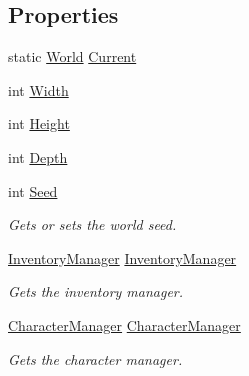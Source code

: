 \subsection*{Properties}
\begin{DoxyCompactItemize}
\item 
static \hyperlink{class_world}{World} \hyperlink{class_world_a611a474efcbf8859dc219c66e667abb4}{Current}
\item 
int \hyperlink{class_world_a861a1e47079f04cf1de46887f76f6177}{Width}
\item 
int \hyperlink{class_world_ac3b5695035eeab526a054329773366fc}{Height}
\item 
int \hyperlink{class_world_a67394494a39fdb85e259e9db96836b8b}{Depth}
\item 
int \hyperlink{class_world_a41b0e31e73a738aece63fcd312be09fa}{Seed}
\begin{DoxyCompactList}\small\item\em Gets or sets the world seed. \end{DoxyCompactList}\item 
\hyperlink{class_inventory_manager}{Inventory\+Manager} \hyperlink{class_world_aa0563c65b3aa81ff47b8a29ec9977b80}{Inventory\+Manager}
\begin{DoxyCompactList}\small\item\em Gets the inventory manager. \end{DoxyCompactList}\item 
\hyperlink{class_project_porcupine_1_1_entities_1_1_character_manager}{Character\+Manager} \hyperlink{class_world_aa17d26c9ced535874e16cf3f7e2da99d}{Character\+Manager}
\begin{DoxyCompactList}\small\item\em Gets the character manager. \end{DoxyCompactList}\item 

\end{DoxyCompactItemize}
